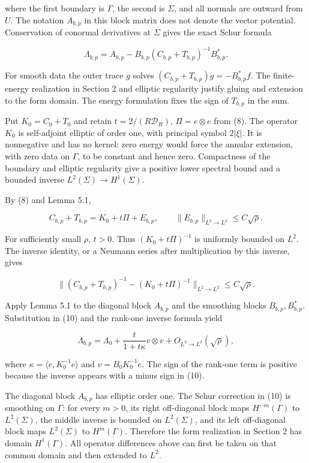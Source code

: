 \documentclass[11pt]{article}
\begin{document}
where the first boundary is \(\Gamma\), the second is \(\Sigma\), and
all normals are outward from \(U\). The notation \(A_{b,p}\) in this
block matrix does not denote the vector potential. Conservation of
conormal derivatives at \(\Sigma\) gives the exact Schur formula

\[\Lambda_{b,p}=A_{b,p}-B_{b,p}(C_{b,p}+T_{b,p})^{-1}B_{b,p}^*.\tag{10}\]

For smooth data the outer trace \(g\) solves
\((C_{b,p}+T_{b,p})g=-B_{b,p}^*f\). The finite-energy realization in
Section 2 and elliptic regularity justify gluing and extension to the
form domain. The energy formulation fixes the sign of \(T_{b,p}\) in the
sum.

Put \(K_0=C_0+T_0\) and retain \(t=2/(R\mathcal D_R)\),
\(\Pi=e\otimes e\) from (8). The operator \(K_0\) is self-adjoint
elliptic of order one, with principal symbol \(2|\xi|\). It is
nonnegative and has no kernel: zero energy would force the annular
extension, with zero data on \(\Gamma\), to be constant and hence zero.
Compactness of the boundary and elliptic regularity give a positive
lower spectral bound and a bounded inverse
\(L^2(\Sigma)\to H^1(\Sigma)\).

By (8) and Lemma 5.1,

\[C_{b,p}+T_{b,p}=K_0+t\Pi+E_{b,p},\qquad
\|E_{b,p}\|_{L^2\to L^2}\leq C\sqrt\rho.\tag{11}\]

For sufficiently small \(\rho\), \(t>0\). Thus \((K_0+t\Pi)^{-1}\) is
uniformly bounded on \(L^2\). The inverse identity, or a Neumann series
after multiplication by this inverse, gives

\[\|(C_{b,p}+T_{b,p})^{-1}-(K_0+t\Pi)^{-1}\|_{L^2\to L^2}
\leq C\sqrt\rho.\]

Apply Lemma 5.1 to the diagonal block \(A_{b,p}\) and the smoothing
blocks \(B_{b,p},B_{b,p}^*\). Substitution in (10) and the rank-one
inverse formula yield

\[\Lambda_{b,p}=\Lambda_0+\frac{t}{1+t\kappa}v\otimes v
+O_{L^2\to L^2}(\sqrt\rho),\tag{12}\]

where \(\kappa=\langle e,K_0^{-1}e\rangle\) and \(v=B_0K_0^{-1}e\). The
sign of the rank-one term is positive because the inverse appears with a
minus sign in (10).

The diagonal block \(A_{b,p}\) has elliptic order one. The Schur
correction in (10) is smoothing on \(\Gamma\): for every \(m>0\), its
right off-diagonal block maps \(H^{-m}(\Gamma)\) to \(L^2(\Sigma)\), the
middle inverse is bounded on \(L^2(\Sigma)\), and its left off-diagonal
block maps \(L^2(\Sigma)\) to \(H^m(\Gamma)\). Therefore the form
realization in Section 2 has domain \(H^1(\Gamma)\). All operator
differences above can first be taken on that common domain and then
extended to \(L^2\).
\end{document}
